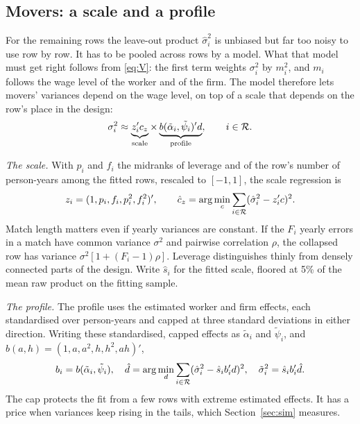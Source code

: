 \subsection{Movers: a scale and a profile}\label{sec:transfer}
For the remaining rows the leave-out product $\hat\sigma_i^2$ is unbiased but far too
noisy to use row by row. It has to be pooled across rows by a model. What that model
must get right follows from \eqref{eq:V}: the first term weights $\sigma_i^2$ by
$m_i^2$, and $m_i$ follows the wage level of the worker and of the firm. The model
therefore lets movers' variances depend on the wage level, on top of a scale that
depends on the row's place in the design:
\[
 \sigma_i^2\approx\underbrace{z_i'c_z}_{\text{scale}}\times
 \underbrace{b(\tilde\alpha_i,\tilde\psi_i)'d}_{\text{profile}},\qquad i\in\mathcal{R} .
\]

\emph{The scale.} With $p_i$ and $f_i$ the midranks of leverage and of the row's
number of person-years among the fitted rows, rescaled to $[-1,1]$, the scale
regression is
\begin{equation}\label{eq:scale}
 z_i=(1,p_i,f_i,p_i^2,f_i^2)',\qquad
 \hat c_z=\arg\min_c\sum_{i\in\mathcal{R}}(\hat\sigma_i^2-z_i'c)^2 .
\end{equation}
Match length matters even if yearly variances are constant. If the $F_i$ yearly errors
in a match have common variance $\sigma^2$ and pairwise correlation $\rho$, the
collapsed row has variance $\sigma^2[1+(F_i-1)\rho]$. Leverage distinguishes thinly
from densely connected parts of the design. Write $\hat s_i$ for the fitted scale,
floored at 5\% of the mean raw product on the fitting sample.

\emph{The profile.} The profile uses the estimated worker and firm effects, each
standardised over person-years and capped at three standard deviations in either
direction. Writing these standardised, capped effects as $\tilde\alpha_i$ and
$\tilde\psi_i$, and $b(a,h)=(1,a,a^2,h,h^2,ah)'$,
\begin{equation}\label{eq:profile}
 b_i=b(\tilde\alpha_i,\tilde\psi_i),\quad
 \hat d=\arg\min_d\sum_{i\in\mathcal{R}}(\hat\sigma_i^2-\hat s_i b_i'd)^2,\quad
 \tilde\sigma_i^2=\hat s_i b_i'\hat d .
\end{equation}
The cap protects the fit from a few rows with extreme estimated effects. It has a
price when variances keep rising in the tails, which Section~\ref{sec:sim} measures.

